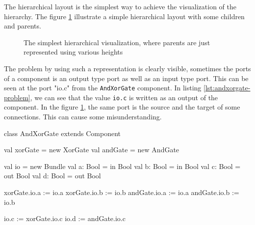 The hierarchical layout is the simplest way to achieve the visualization of the
hierarchy. The figure \ref{fig:hierarchical-layout-simple} illustrate a simple
hierarchical layout with some children and parents.

\begin{figure}[H]
  \centering
  \caption[Simple hierarchical layout for diagram visualization]{The simplest
    hierarchical visualization, where parents are just represented using various
    heights}
  \label{fig:hierarchical-layout-simple}
\end{figure}

The problem by using such a representation is clearly visible, sometimes the
ports of a component is an output type port as well as an input type port.
This can be seen at the port "io.c" from the \texttt{AndXorGate} component. In
listing \ref{lst:andxorgate-problem}, we can see that the value \verb|io.c| is
written as an output of the component. In the figure
\ref{fig:hierarchical-layout-simple}, the same port is the source and the target
of some connections. This can cause some misunderstanding.

\begin{listing}[H]
  \centering
\begin{scalacode}
class AndXorGate extends Component {

  val xorGate = new XorGate
  val andGate = new AndGate

  val io = new Bundle {
    val a: Bool = in Bool
    val b: Bool = in Bool
    val c: Bool = out Bool
    val d: Bool = out Bool
  }

  xorGate.io.a := io.a
  xorGate.io.b := io.b
  andGate.io.a := io.a
  andGate.io.b := io.b

  io.c := xorGate.io.c
  io.d := andGate.io.c
}
\end{scalacode}
  \caption[The AndXorGate component written with SpinalHDL]{The AndXorGate
component writtent with SpinalHDL. We can see that the ``c'' port is an output
of the components and in figure \ref{fig:hierarchical-layout-simple} the port is
shown as an input port and as an output port.}
  \label{lst:andxorgate-problem}
\end{listing}

